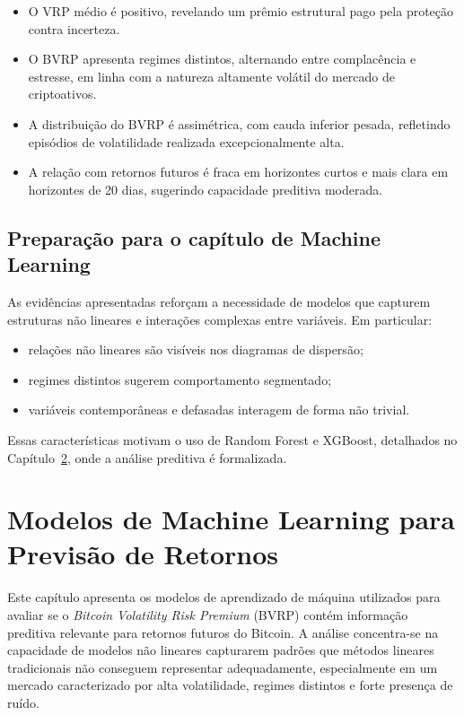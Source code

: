 \begin{itemize}
    \item O VRP médio é positivo, revelando um prêmio estrutural pago pela
          proteção contra incerteza.
    \item O BVRP apresenta regimes distintos, alternando entre complacência e
          estresse, em linha com a natureza altamente volátil do mercado de
          criptoativos.
    \item A distribuição do BVRP é assimétrica, com cauda inferior pesada,
          refletindo episódios de volatilidade realizada excepcionalmente alta.
    \item A relação com retornos futuros é fraca em horizontes curtos e mais
          clara em horizontes de 20 dias, sugerindo capacidade preditiva
          moderada.
\end{itemize}

\section{Preparação para o capítulo de Machine Learning}

As evidências apresentadas reforçam a necessidade de modelos que capturem
estruturas não lineares e interações complexas entre variáveis. Em particular:

\begin{itemize}
    \item relações não lineares são visíveis nos diagramas de dispersão;
    \item regimes distintos sugerem comportamento segmentado;
    \item variáveis contemporâneas e defasadas interagem de forma não trivial.
\end{itemize}

Essas características motivam o uso de Random Forest e XGBoost, detalhados no
Capítulo~\ref{chap:ml}, onde a análise preditiva é formalizada.


\chapter{Modelos de Machine Learning para Previsão de Retornos}
\label{chap:ml}

Este capítulo apresenta os modelos de aprendizado de máquina utilizados para
avaliar se o \textit{Bitcoin Volatility Risk Premium} (BVRP) contém informação
preditiva relevante para retornos futuros do Bitcoin. A análise concentra-se na
capacidade de modelos não lineares capturarem padrões que métodos lineares
tradicionais não conseguem representar adequadamente, especialmente em um mercado
caracterizado por alta volatilidade, regimes distintos e forte presença de ruído.

